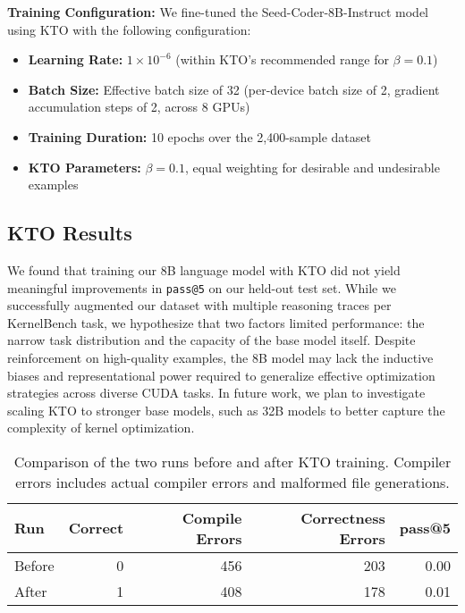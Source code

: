 \documentclass{article}
\begin{document}
\textbf{Training Configuration:} We fine-tuned the Seed-Coder-8B-Instruct model using KTO with the following configuration:
\begin{itemize}
\item \textbf{Learning Rate:} $1 \times 10^{-6}$ (within KTO's recommended range for $\beta = 0.1$)
\item \textbf{Batch Size:} Effective batch size of 32 (per-device batch size of 2, gradient accumulation steps of 2, across 8 GPUs)
\item \textbf{Training Duration:} 10 epochs over the 2,400-sample dataset
\item \textbf{KTO Parameters:} $\beta = 0.1$, equal weighting for desirable and undesirable examples
\end{itemize}


\subsection{KTO Results}

We found that training our 8B language model with KTO did not yield meaningful improvements in \texttt{pass@5} on our held-out test set. While we successfully augmented our dataset with multiple reasoning traces per KernelBench task, we hypothesize that two factors limited performance: the narrow task distribution and the capacity of the base model itself. Despite reinforcement on high-quality examples, the 8B model may lack the inductive biases and representational power required to generalize effective optimization strategies across diverse CUDA tasks. In future work, we plan to investigate scaling KTO to stronger base models, such as 32B models to better capture the complexity of kernel optimization.

\begin{table}[h]
\centering
\begin{tabular}{lrrrr}
\toprule
\textbf{Run} & \textbf{Correct} & \textbf{Compile Errors} & \textbf{Correctness Errors} & \textbf{pass@5} \\
\midrule
Before & 0 & 456 & 203 & 0.00 \\
After  & 1 & 408 & 178 & 0.01 \\
\bottomrule
\end{tabular}
\caption{Comparison of the two runs before and after KTO training. Compiler errors includes actual compiler errors and malformed file generations.}
\end{table}


\end{document}
